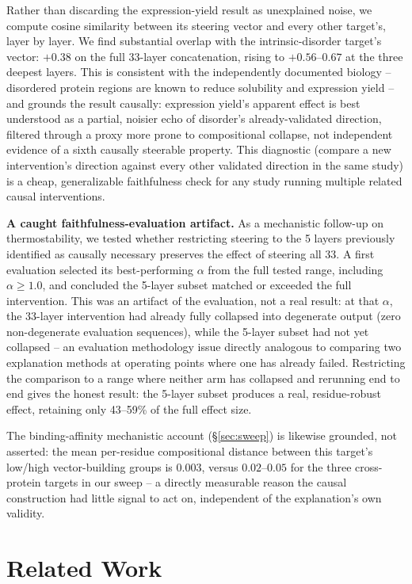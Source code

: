 \documentclass{article}
\begin{document}
Rather than discarding the expression-yield result as unexplained noise,
we compute cosine similarity between its steering vector and every other
target's, layer by layer. We find substantial overlap with the
intrinsic-disorder target's vector: $+0.38$ on the full 33-layer
concatenation, rising to $+0.56$--$0.67$ at the three deepest layers. This
is consistent with the independently documented biology -- disordered
protein regions are known to reduce solubility and expression yield --
and grounds the result causally: expression yield's apparent effect is
best understood as a partial, noisier echo of disorder's already-validated
direction, filtered through a proxy more prone to compositional collapse,
not independent evidence of a sixth causally steerable property. This
diagnostic (compare a new intervention's direction against every other
validated direction in the same study) is a cheap, generalizable
faithfulness check for any study running multiple related causal
interventions.

\textbf{A caught faithfulness-evaluation artifact.} As a mechanistic
follow-up on thermostability, we tested whether restricting steering to
the 5 layers previously identified as causally necessary preserves the
effect of steering all 33. A first evaluation selected its
best-performing $\alpha$ from the full tested range, including
$\alpha\geq1.0$, and concluded the 5-layer subset matched or exceeded the
full intervention. This was an artifact of the evaluation, not a real
result: at that $\alpha$, the 33-layer intervention had already fully
collapsed into degenerate output (zero non-degenerate evaluation
sequences), while the 5-layer subset had not yet collapsed -- an
evaluation methodology issue directly analogous to comparing two
explanation methods at operating points where one has already failed.
Restricting the comparison to a range where neither arm has collapsed and
rerunning end to end gives the honest result: the 5-layer subset produces
a real, residue-robust effect, retaining only 43--59\% of the full effect
size.

The binding-affinity mechanistic account (\S\ref{sec:sweep}) is likewise
grounded, not asserted: the mean per-residue compositional distance
between this target's low/high vector-building groups is $0.003$, versus
$0.02$--$0.05$ for the three cross-protein targets in our sweep -- a
directly measurable reason the causal construction had little signal to
act on, independent of the explanation's own validity.

\section{Related Work}
\end{document}
